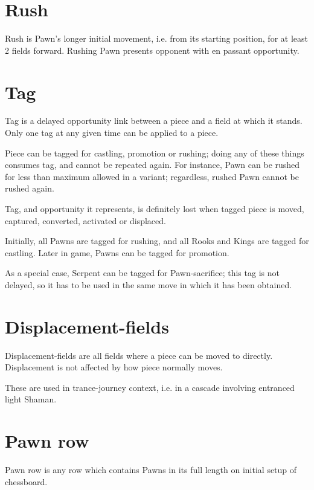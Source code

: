 \section*{Rush}
\label{sec:Terms/Rush}
Rush is Pawn's longer initial movement, i.e. from its starting position, for at
least 2 fields forward. Rushing Pawn presents opponent with en passant opportunity.

\section*{Tag}
\label{sec:Terms/Tag}
Tag is a delayed opportunity link between a piece and a field at which it stands.
Only one tag at any given time can be applied to a piece.

Piece can be tagged for castling, promotion or rushing; doing any of these things
consumes tag, and cannot be repeated again. For instance, Pawn can be rushed for
less than maximum allowed in a variant; regardless, rushed Pawn cannot be rushed
again.

Tag, and opportunity it represents, is definitely lost when tagged piece is moved,
captured, converted, activated or displaced.

Initially, all Pawns are tagged for rushing, and all Rooks and Kings are tagged
for castling. Later in game, Pawns can be tagged for promotion.

As a special case, Serpent can be tagged for Pawn-sacrifice; this tag is not
delayed, so it has to be used in the same move in which it has been obtained.

\section*{Displacement-fields}
\label{sec:Terms/Displacement-fields}
Displacement-fields are all fields where a piece can be moved to directly.
Displacement is not affected by how piece normally moves.

These are used in trance-journey context, i.e. in a cascade involving entranced
light Shaman.

\section*{Pawn row}
\label{sec:Terms/Pawn row}
Pawn row is any row which contains Pawns in its full length on initial setup
of chessboard.

